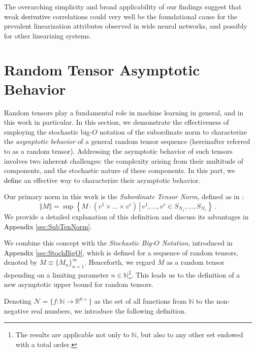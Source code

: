 \documentclass{article} %
\begin{document}
The overarching simplicity and broad applicability of our findings suggest that weak \textcolor{black}{derivative} correlations could very well be the foundational cause for the prevalent linearization attributes observed in wide neural networks, and possibly for other linearizing systems.

\section{Random Tensor Asymptotic Behavior}
\label{sec:TenAsy}

Random tensors play a fundamental role in machine learning in general, and in this work in particular. In this section, we demonstrate the effectiveness of employing the stochastic big-$O$ notation of the subordinate norm to characterize the \textit{asymptotic behavior} of a general random tensor sequence (hereinafter referred to as a random tensor). Addressing the asymptotic behavior of such tensors involves two inherent challenges: the complexity arising from their multitude of components, and the stochastic nature of these components. In this part, we \textcolor{black}{define} an effective way to characterize their asymptotic behavior.

Our primary norm in this work is the \emph{Subordinate Tensor Norm}, defined as in \cite{SubNorm1991}:
\begin{equation}
\label{eq:NormNew}
\left\Vert M\right\Vert = \sup\left\{ \left. M\cdot\left(v^{1}\times\ldots\times v^{r}\right) \,\right|\, v^{1},\ldots,v^{r} \in S_{N_{1}},\ldots,S_{N_{r}} \right\} \ .
\end{equation}
We provide a detailed explanation of this definition and discuss its advantages in \textcolor{black}{Appendix \ref{sec:SubTenNorm}}.

We combine this concept with the \emph{Stochastic Big-$O$ Notation}, introduced in \textcolor{black}{Appendix \ref{sec:StochBigO}}, which is defined for a sequence of random tensors, denoted by \( M \equiv \{ M_{n} \}_{n=1}^{\infty} \). Henceforth, we regard \( M \) as a random tensor depending on a limiting parameter \( n \in \mathbb{N} \)\footnote{The results are applicable not only to \( \mathbb{N} \), but also to any other set endowed with a total order.}. This leads us to the definition of a new asymptotic upper bound for random tensors.

Denoting \(\mathcal{N} = \{ f : \mathbb{N} \to \mathbb{R}^{0+} \}\) as the set of all functions from \(\mathbb{N}\) to the non-negative real numbers, we introduce the following definition.
\end{document}
